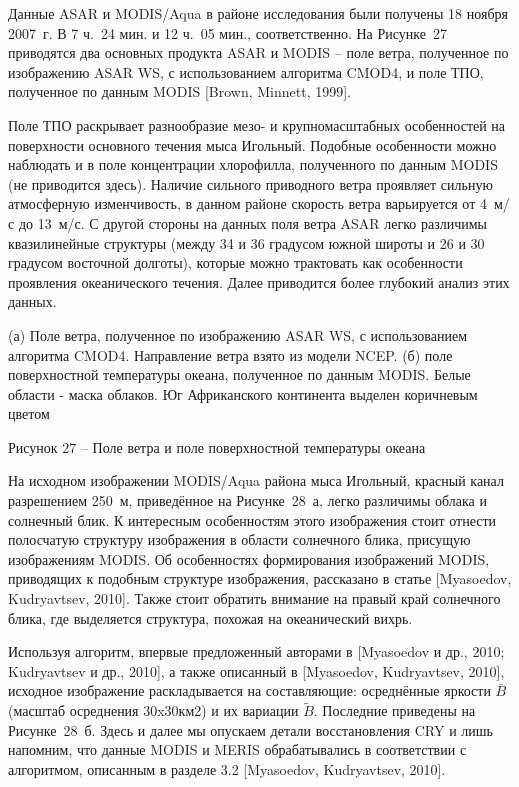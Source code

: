 Данные ASAR и MODIS/Aqua в районе исследования были получены 18 ноября 2007~г. В 7 ч.~24 мин. и 12 ч.~05 мин., соответственно. На Рисунке~27 приводятся два основных продукта ASAR и MODIS -- поле ветра, полученное по изображению ASAR WS, с использованием алгоритма CMOD4, и поле ТПО, полученное по данным MODIS [Brown, Minnett, 1999].

Поле ТПО раскрывает разнообразие мезо- и крупномасштабных особенностей на поверхности основного течения мыса Игольный. Подобные особенности можно наблюдать и в поле концентрации хлорофилла, полученного по данным MODIS (не приводится здесь). Наличие сильного приводного ветра проявляет сильную атмосферную изменчивость, в данном районе скорость ветра варьируется от 4~м/с до 13~м/с. С другой стороны на данных поля ветра ASAR легко различимы квазилинейные структуры (между 34 и 36 градусом южной широты и 26 и 30 градусом восточной долготы), которые можно трактовать как особенности проявления океанического течения. Далее приводится более глубокий анализ этих данных.



(а) Поле ветра, полученное по изображению ASAR WS, с использованием алгоритма CMOD4. Направление ветра взято из модели NCEP. (б) поле поверхностной температуры океана, полученное по данным MODIS. Белые области - маска облаков. Юг Африканского континента выделен коричневым цветом



Рисунок 27 -- Поле ветра и поле поверхностной температуры океана



На исходном изображении MODIS/Aqua района мыса Игольный, красный канал разрешением 250~м, приведённое на Рисунке~28~а, легко различимы облака и солнечный блик. К интересным особенностям этого изображения стоит отнести полосчатую структуру изображения в области солнечного блика, присущую изображениям MODIS. Об особенностях формирования изображений MODIS, приводящих к подобным структуре изображения, рассказано в статье [Myasoedov, Kudryavtsev, 2010]. Также стоит обратить внимание на правый край солнечного блика, где выделяется структура, похожая на океанический вихрь.

Используя алгоритм, впервые предложенный авторами в [Myasoedov и др., 2010; Kudryavtsev и др., 2010], а также описанный в [Myasoedov, Kudryavtsev, 2010], исходное изображение раскладывается на составляющие: осреднённые яркости $\bar{B}$ (масштаб осреднения 30x30км2) и их вариации $\tilde{B}$. Последние приведены на Рисунке~28~б. Здесь и далее мы опускаем детали восстановления CRY и лишь напомним, что данные MODIS и MERIS обрабатывались в соответствии с алгоритмом, описанным в разделе 3.2 [Myasoedov, Kudryavtsev, 2010].





